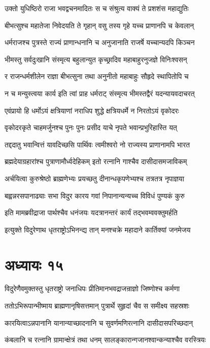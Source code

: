 \twolineshloka
{उक्तो युधिष्ठिरो राजा भवद्वचनमादितः}
{स च संश्रुत्य वाक्यं ते प्रशशंस महाद्युतिः}


\twolineshloka
{बीभत्सुश्च महातेजा निवेदयति ते गृहान्}
{वसु तस्य गृहे यच्च प्राणानपि च केवलान्}


\twolineshloka
{धर्मराजश्च पुत्रस्ते राज्यं प्राणान्धनानि च}
{अनुजानाति राजर्षे यच्चान्यदपि किञ्चन}


\twolineshloka
{भीमस्तु सर्वदुःखानि संस्मृत्य बहुलान्युत}
{कृच्छ्रादिव महाबाहुरनुजज्ञे विनिःश्वसन्}


\twolineshloka
{र राजन्धर्मशीलेन राज्ञा बीभत्सुना तथा}
{अनुनीतो महाबाहुः सौहृदे स्थापितोपि च}


\twolineshloka
{न च मन्युस्त्वया कार्य इति त्वां प्राह धर्मराट्}
{संस्मृत्य भीमस्तद्वैरं यदन्यायवदाचरत्}


\twolineshloka
{एवंप्रायो हि धर्मोऽयं क्षत्रियाणां नराधिप}
{शुद्धे क्षत्रियधर्मे न निरतोऽयं वृकोदरः}


\twolineshloka
{वृकोदरकृते चाहमर्जुनश्च पुनः पुनः}
{प्रसीद याचे नृपते भवान्प्रभुरिहास्ति यत्}


\twolineshloka
{तद्ददातु भवान्वित्तं यावदिच्छसि पार्थिवः}
{त्वमीश्वरो नो राज्यस्य प्राणानामपि भारत}


\twolineshloka
{ब्रह्मदेयाग्रहारांश्च पुत्राणामौर्ध्वदेहिकम्}
{इतो रत्नानि गाश्चैव दासीदासमजाविकम्}


\twolineshloka
{अर्चयित्वा कुरुश्रेष्ठो ब्राह्मणेभ्यः प्रयच्छतु}
{दीनान्धकृपणेभ्यश्च तत्रतत्र नृपाज्ञया}


\twolineshloka
{बह्वन्नरसपानाढ्याः सभा विदुर कारय}
{गवां निपानान्यन्यच्च विविधं पुण्यकं कुरु}


\twolineshloka
{इति मामब्रवीद्राजा पार्थश्चैव धनंजयः}
{यदत्रानन्तरं कार्यं तद्भवम्ववक्तुमर्हति}


\twolineshloka
{इत्युक्ते विदुरेणाथ धृतराष्ट्रोऽभिनन्द्य तान्}
{मनश्चक्रे महादाने कार्तिक्यां जनमेजय}


\chapter{अध्यायः १५}
\twolineshloka
{विदुरेणैवमुक्तस्तु धृतराष्ट्रो जनाधिपः}
{प्रीतिमानभवद्राजन्राज्ञो जिष्णोश्च कर्मणा}


\twolineshloka
{ततोऽभिरूपान्भीष्माय ब्राह्मणानृषिसत्तमान्}
{पुत्रार्थे सुहृदां चैव स समीक्ष्य सहस्रशः}


\twolineshloka
{कारयित्वाऽन्नपानानि यानान्याच्छादनानि च}
{सुवर्णमणिरत्नानि दासीदासपरिच्छदान्}


\twolineshloka
{कंबलानि च रत्नानि ग्रामान्क्षेत्रं तथा धनम्}
{सालङ्कारान्गजानश्वान्कन्याश्चैव वरस्त्रियः}


